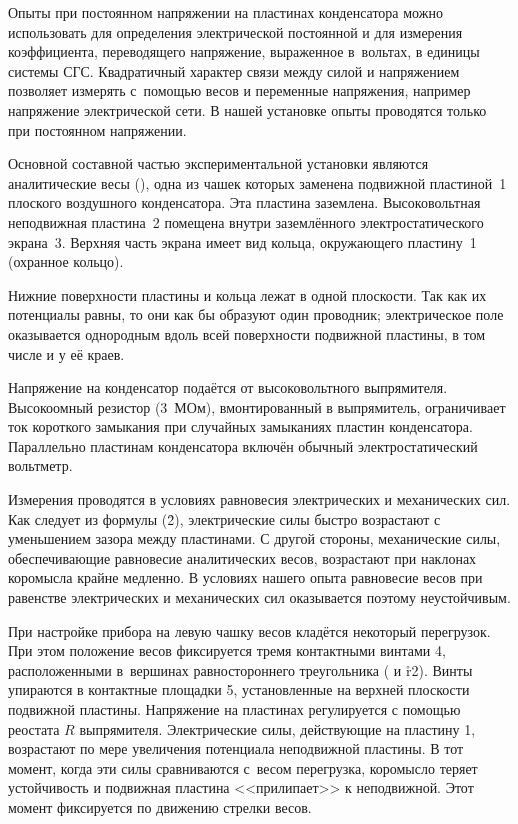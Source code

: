Опыты при постоянном напряжении на пластинах конденсатора можно использовать для определения электрической постоянной и
для измерения коэффициента, переводящего напряжение, выраженное в~вольтах, в единицы системы СГС. Квадратичный характер
связи между силой и напряжением позволяет измерять с~помощью весов и переменные напряжения, например напряжение
электрической сети. В нашей установке опыты проводятся только при постоянном напряжении.


\eo Основной составной частью экспериментальной установки являются аналитические весы (), одна из чашек которых
заменена подвижной пластиной~1 плоского воздушного конденсатора. Эта пластина заземлена. Высоковольтная неподвижная
пластина~2 помещена внутри заземлённого электростатического экрана~3. Верхняя часть экрана имеет вид кольца, окружающего
пластину~1 (охранное кольцо).

Нижние поверхности пластины и кольца лежат в одной плоскости. Так как их потенциалы равны, то они как бы образуют один
проводник; электрическое поле оказывается однородным вдоль всей поверхности подвижной пластины, в том числе и у её краев.

Напряжение на конденсатор подаётся от высоковольтного выпрямителя. Высокоомный резистор (3~МОм), вмонтированный в
выпрямитель, ограничивает ток короткого замыкания при случайных замыканиях пластин конденсатора. Параллельно пластинам
конденсатора включён обычный электростатический вольтметр.


Измерения проводятся в условиях равновесия электрических и механических сил. Как следует из формулы (\r{2}),
электрические силы быстро возрастают с уменьшением зазора между пластинами. С другой стороны, механические силы,
обеспечивающие равновесие аналитических весов, возрастают при наклонах коромысла крайне медленно. В условиях нашего
опыта равновесие весов при равенстве электрических и механических сил оказывается поэтому неустойчивым.

При настройке прибора на левую чашку весов кладётся некоторый перегрузок. При этом положение весов фиксируется тремя
контактными винтами 4, расположенными в~вершинах равностороннего треугольника ( и \r{r2}). Винты упираются в
контактные площадки 5, установленные на верхней плоскости подвижной пластины. Напряжение на пластинах регулируется с
помощью реостата $R$ выпрямителя. Электрические силы, действующие на пластину 1, возрастают по мере увеличения
потенциала неподвижной пластины. В тот момент, когда эти силы сравниваются с~весом перегрузка, коромысло теряет
устойчивость и подвижная пластина <<прилипает>> к неподвижной. Этот момент фиксируется по движению стрелки весов.

